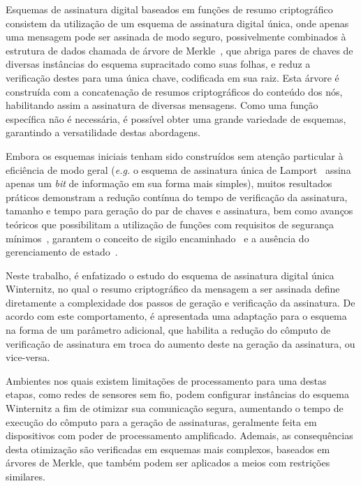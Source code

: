 \documentclass{ufsctex/ufsctex}
\begin{document}
Esquemas de assinatura digital baseados em funções de resumo criptográfico
consistem da utilização de um esquema de assinatura digital única, onde apenas
uma mensagem pode ser assinada de modo seguro, possivelmente combinados à
estrutura de dados chamada de árvore de Merkle~\cite{Merkle:inproc:1989:aug},
que abriga pares de chaves de diversas instâncias do esquema supracitado como
suas folhas, e reduz a verificação destes para uma única chave, codificada em
sua raiz. Esta árvore é construída com a concatenação de resumos criptográficos
do conteúdo dos nós, habilitando assim a assinatura de diversas mensagens. Como
uma função específica não é necessária, é possível obter uma grande variedade
de esquemas, garantindo a versatilidade destas abordagens.

Embora os esquemas iniciais tenham sido construídos sem atenção particular à
eficiência de modo geral (\emph{e.g.} o esquema de assinatura única de
Lamport~\cite{Lamport:report:1979:oct} assina apenas um \emph{bit} de
informação em sua forma mais simples), muitos resultados práticos demonstram a
redução contínua do tempo de verificação da assinatura, tamanho e tempo para
geração do par de chaves e assinatura, bem como avanços teóricos que
possibilitam a utilização de funções com requisitos de segurança
mínimos~\cite{Huelsing:inproc:2013:jun}, garantem o conceito de sigilo
encaminhado~\cite{Buchmann:inproc:2011:nov} e a ausência do gerenciamento de
estado~\cite{Bernstein:inproc:2015:apr}.

Neste trabalho, é enfatizado o estudo do esquema de assinatura digital única
Winternitz, no qual o resumo criptográfico da mensagem a ser assinada define
diretamente a complexidade dos passos de geração e verificação da assinatura.
De acordo com este comportamento, é apresentada uma adaptação para o esquema
na forma de um parâmetro adicional, que habilita a redução do cômputo de
verificação de assinatura em troca do aumento deste na geração da assinatura,
ou vice-versa.

Ambientes nos quais existem limitações de processamento para uma destas etapas,
como redes de sensores sem fio, podem configurar instâncias do esquema
Winternitz a fim de otimizar sua comunicação segura, aumentando o tempo de
execução do cômputo para a geração de assinaturas, geralmente feita em
dispositivos com poder de processamento amplificado. Ademais, as consequências
desta otimização são verificadas em esquemas mais complexos, baseados em
árvores de Merkle, que também podem ser aplicados a meios com restrições
similares.
\end{document}
